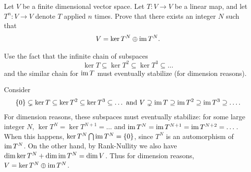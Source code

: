 \begin{sproblem}
	\label{prob:endomorphism_eventual_lemma}
	\onechili
	Let $V$ be a finite dimensional vector space.
	Let $T \colon V \to V$ be a linear map,
	and let $T^n \colon V \to V$ denote $T$ applied $n$ times.
	Prove that there exists an integer $N$ such that
	\[ V = \ker T^N \oplus \operatorname{im} T^N. \]
	\begin{hint}
		Use the fact that the infinite chain of subspaces
		\[ \ker T \subseteq \ker T^2 \subseteq \ker T^3 \subseteq \dots \]
		and the similar chain for $\operatorname{im} T$ must eventually stabilize
		(for dimension reasons).
	\end{hint}
	\begin{sol}
		Consider
		\[
			\{0\} \subsetneq \ker T \subseteq \ker T^2 \subseteq \ker T^3 \subseteq \dots
			\text{  and  }
			V \supsetneq \operatorname{im} T \supseteq \operatorname{im} T^2 \supseteq \operatorname{im} T^3 \supseteq \dots.
		\]
		For dimension reasons, these subspaces must eventually stabilize:
		for some large integer $N$,
		$\ker T^N = \ker T^{N+1} = \dots$
		and $\operatorname{im} T^N = \operatorname{im} T^{N+1} = \operatorname{im} T^{N+2} = \dots$.
		When this happens, $\ker T^N \bigcap \operatorname{im} T^N = \{0\}$,
		since $T^N$ is an automorphism of $\operatorname{im} T^N$.
		On the other hand, by Rank-Nullity we also have
		$\dim \ker T^N + \dim \operatorname{im} T^N = \dim V$.
		Thus for dimension reasons, $V = \ker T^N \oplus \operatorname{im} T^N$.
	\end{sol}
\end{sproblem}

